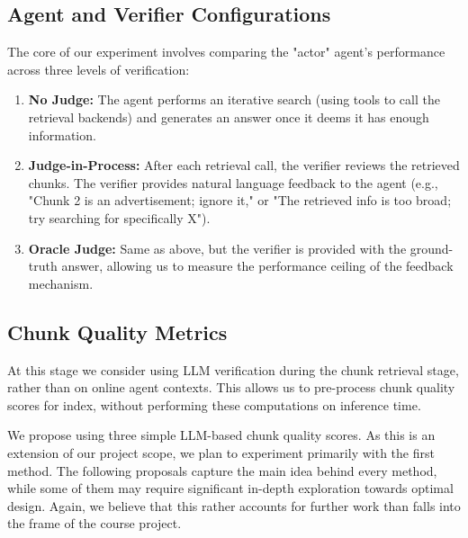 \documentclass[11pt]{article}
\begin{document}
\subsection{Agent and Verifier Configurations}
The core of our experiment involves comparing the "actor" agent’s performance across three levels of verification:
\begin{enumerate}
\item \textbf{No Judge:} The agent performs an iterative search (using tools to call the retrieval backends) and generates an answer once it deems it has enough information.
\item \textbf{Judge-in-Process:} After each retrieval call, the verifier reviews the retrieved chunks. The verifier provides natural language feedback to the agent (e.g., "Chunk 2 is an advertisement; ignore it," or "The retrieved info is too broad; try searching for specifically X").
\item \textbf{Oracle Judge:} Same as above, but the verifier is provided with the ground-truth answer, allowing us to measure the performance ceiling of the feedback mechanism.
\end{enumerate}

\subsection{Chunk Quality Metrics}
At this stage we consider using LLM verification during the chunk retrieval stage, rather than on online agent contexts. This allows us to pre-process chunk quality scores for index, without performing these computations on inference time.

We propose using three simple LLM-based chunk quality scores. As this is an extension of our project scope, we plan to experiment primarily with the first method. The following proposals capture the main idea behind every method, while some of them may require significant in-depth exploration towards optimal design. Again, we believe that this rather accounts for further work than falls into the frame of the course project.
\end{document}
